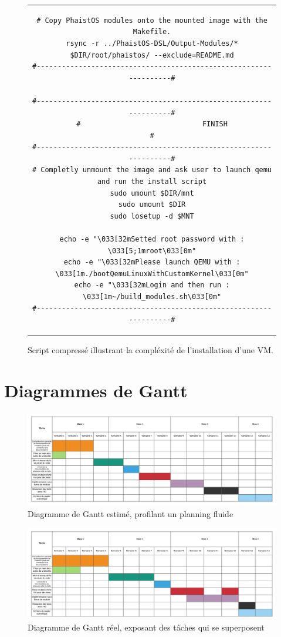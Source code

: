\begin{figure}[h!t]
\begin{tabular}{c}
\begin{lstlisting}[style=customShell, linewidth=0.9\textwidth]
# Copy PhaistOS modules onto the mounted image with the Makefile.
rsync -r ../PhaistOS-DSL/Output-Modules/* $DIR/root/phaistos/ --exclude=README.md
#------------------------------------------------------------------#

#------------------------------------------------------------------#
#                             FINISH                               #
#------------------------------------------------------------------#
# Completly unmount the image and ask user to launch qemu and run the install script
sudo umount $DIR/mnt
sudo umount $DIR
sudo losetup -d $MNT

echo -e "\033[32mSetted root password with : \033[5;1mroot\033[0m"
echo -e "\033[32mPlease launch QEMU with : \033[1m./bootQemuLinuxWithCustomKernel\033[0m"
echo -e "\033[32mLogin and then run : \033[1m~/build_modules.sh\033[0m"
#------------------------------------------------------------------#
        \end{lstlisting}
    \end{tabular}
    \caption{Script compressé illustrant la compléxité de l'installation d'une VM.}
    \label{fig:script}
\end{figure}

\newpage
\section*{Diagrammes de Gantt}

\begin{figure}[h!t] \centering
    \includegraphics[width=\textwidth]{images/gantt_expected}
    \caption{Diagramme de Gantt estimé, profilant un planning fluide}
    \label{fig:gantt_1}
\end{figure}

\begin{figure}[h!t] \centering
    \includegraphics[width=\textwidth]{images/gantt_real}
    \caption{Diagramme de Gantt réel, exposant des tâches qui se superposent}
    \label{fig:gantt_2}
\end{figure}